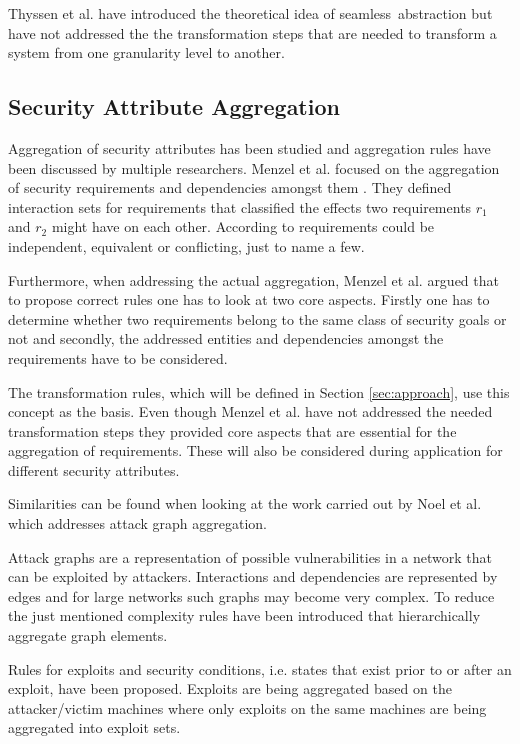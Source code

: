 Thyssen et al. have introduced the theoretical idea of \glqq seamless\grqq \ abstraction but have not addressed the the transformation steps that are needed to transform a system from one granularity level to another.  

\subsection{Security Attribute Aggregation}
\label{subsec:aggregation}
Aggregation of security attributes has been studied and aggregation rules have been discussed by multiple researchers. Menzel et al. focused on the aggregation of security requirements and dependencies amongst them \cite{Menzel2008}. They defined interaction sets for requirements that classified the effects two requirements $r_1$ and $r_2$ might have on each other. According to \cite{Menzel2008} requirements could be independent, equivalent or conflicting, just to name a few.

Furthermore, when addressing the actual aggregation, Menzel et al. argued that to propose correct rules one has to look at two core aspects. Firstly one has to determine whether two requirements belong to the same class of security goals or not and secondly, the addressed entities and dependencies amongst the requirements have to be considered.

The transformation rules, which will be defined in Section \ref{sec:approach}, use this concept as the basis. Even though Menzel et al. have not addressed the needed transformation steps they provided core aspects that are essential for the aggregation of requirements. These will also be considered during application for different security attributes.

Similarities can be found when looking at the work carried out by Noel et al. \cite{Noel:2004:MAG:1029208.1029225} which addresses attack graph aggregation. 

Attack graphs are a representation of possible vulnerabilities in a network that can be exploited by attackers. Interactions and dependencies are represented by edges and for large networks such graphs may become very complex. To reduce the just mentioned complexity rules have been introduced that hierarchically aggregate graph elements. 

Rules for exploits and security conditions, i.e. states that exist prior to or after an exploit, have been proposed. Exploits are being aggregated based on the attacker/victim machines where only exploits on the same machines are being aggregated into exploit sets. 

